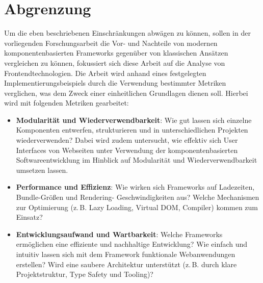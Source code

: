 \documentclass[oneside]{ausarbeitung}
\begin{document}
\section{Abgrenzung}
Um die eben beschriebenen Einschränkungen abwägen zu können, sollen in der vorliegenden Forschungsarbeit die Vor- und Nachteile von modernen komponentenbasierten Frameworks gegenüber von klassischen Ansätzen vergleichen zu können, fokussiert sich diese Arbeit auf die Analyse von Frontendtechnologien. 
Die Arbeit wird anhand eines festgelegten Implementierungsbeispiels durch die Verwendung bestimmter Metriken verglichen, was dem Zweck einer einheitlichen Grundlagen dienen soll. Hierbei wird mit folgenden Metriken gearbeitet: 
\begin{itemize}
    \item \textbf{Modularität und Wiederverwendbarkeit}:  
Wie gut lassen sich einzelne Komponenten entwerfen, strukturieren und in unterschiedlichen Projekten wiederverwenden? Dabei wird zudem untersucht, wie effektiv sich User Interfaces von Webseiten unter Verwendung der komponentenbasierten Softwareentwicklung im Hinblick auf Modularität und Wiederverwendbarkeit umsetzen lassen.
    \item \textbf{Performance und Effizienz}:  
          Wie wirken sich Frameworks auf Ladezeiten, Bundle-Größen und Rendering- Geschwindigkeiten aus?
          Welche Mechanismen zur Optimierung (z.\,B. Lazy Loading, Virtual DOM, Compiler) kommen zum Einsatz?
    \item \textbf{Entwicklungsaufwand und Wartbarkeit}:  
          Welche Frameworks ermöglichen eine effiziente und nachhaltige Entwicklung?
                    Wie einfach und intuitiv lassen sich mit dem Framework funktionale Webanwendungen erstellen?
          Wird eine saubere Architektur unterstützt (z.\,B. durch klare Projektstruktur, Type Safety und Tooling)?
\end{itemize}
\end{document}
